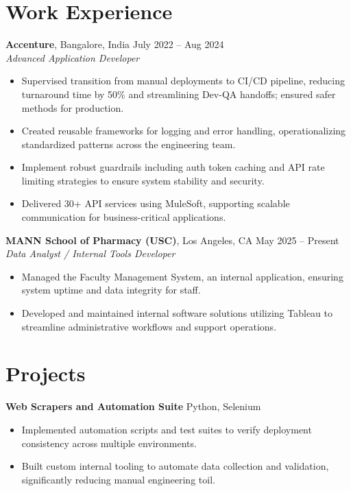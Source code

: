 \documentclass[letterpaper,10pt]{article}
\begin{document}
\section*{Work Experience}
\textbf{Accenture}, Bangalore, India \hfill July 2022 -- Aug 2024 \\
\textit{Advanced Application Developer}
\begin{itemize}[leftmargin=*,noitemsep,topsep=-2pt]
    \item Supervised transition from manual deployments to CI/CD pipeline, reducing turnaround time by 50\% and streamlining Dev-QA handoffs; ensured safer methods for production.
    \item Created reusable frameworks for logging and error handling, operationalizing standardized patterns across the engineering team.
    \item Implement robust guardrails including auth token caching and API rate limiting strategies to ensure system stability and security.
    \item Delivered 30+ API services using MuleSoft, supporting scalable communication for business-critical applications.
\end{itemize}

\textbf{MANN School of Pharmacy (USC)}, Los Angeles, CA \hfill May 2025 -- Present \\
\textit{Data Analyst / Internal Tools Developer}
\begin{itemize}[leftmargin=*,noitemsep,topsep=-2pt]
    \item Managed the Faculty Management System, an internal application, ensuring system uptime and data integrity for staff.
    \item Developed and maintained internal software solutions utilizing Tableau to streamline administrative workflows and support operations.
\end{itemize}

\section*{Projects}
\textbf{Web Scrapers and Automation Suite} \hfill Python, Selenium
\begin{itemize}[leftmargin=*,noitemsep,topsep=-2pt]
    \item Implemented automation scripts and test suites to verify deployment consistency across multiple environments.
    \item Built custom internal tooling to automate data collection and validation, significantly reducing manual engineering toil.
\end{itemize}
\end{document}
